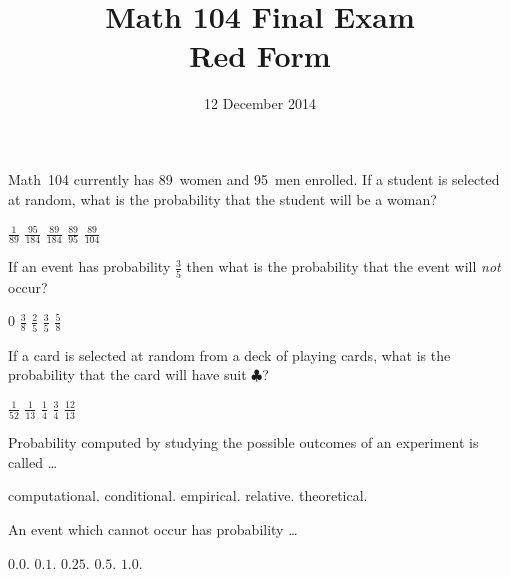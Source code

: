 \documentclass[answers,12pt]{exam}
\title{Math 104 Final Exam\\Red Form}
\date{12 December 2014}
\begin{document}
\maketitle
\begin{center}
\end{center}

\begin{questions}
\question Math~104 currently has 89~women and 95~men enrolled.
If a student is selected at random, what is the probability
that the student will be a woman?\\
\begin{oneparchoices}
\choice $\frac{1}{89}$
\choice $\frac{95}{184}$
\correctchoice\choice $\frac{89}{184}$
\choice $\frac{89}{95}$
\choice $\frac{89}{104}$
\end{oneparchoices}

\question If an event has probability $\frac{3}{5}$
then what is the probability that the event will {\em not} occur?\\
\begin{oneparchoices}
\choice $0$
\choice $\frac{3}{8}$
\correctchoice $\frac{2}{5}$
\choice $\frac{3}{5}$
\choice $\frac{5}{8}$
\end{oneparchoices}

\question If a card is selected at random from a deck of
playing cards, what is the probability that
the card will have suit $\clubsuit$?\\
\begin{oneparchoices}
\choice $\frac{1}{52}$
\choice $\frac{1}{13}$
\correctchoice $\frac{1}{4}$
\choice $\frac{3}{4}$
\choice $\frac{12}{13}$
\end{oneparchoices}

\question Probability computed by studying
the possible outcomes of an experiment is called \dots\\
\begin{oneparchoices}
\choice computational.
\choice conditional.
\choice empirical.
\choice relative.
\choice theoretical.
\end{oneparchoices}

\question An event which cannot occur has probability \dots\\
\begin{oneparchoices}
\choice $0.0$.
\choice $0.1$.
\choice $0.25$.
\choice $0.5$.
\choice $1.0$.
\end{oneparchoices}


\end{questions}
\end{document}
